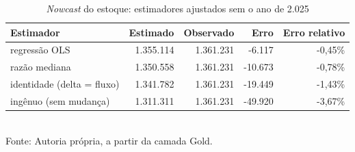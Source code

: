 \begin{table}[htbp]
    \centering
    \caption{\textit{Nowcast} do estoque: estimadores ajustados sem o ano de 2.025}
    \label{tab:nowcast}
    \footnotesize
    \renewcommand{\arraystretch}{1.25}
    \begin{tabular}{lrrrr}
        \toprule
        \rowcolor{black!8}
        \textbf{Estimador} & \textbf{Estimado} & \textbf{Observado} & \textbf{Erro} & \textbf{Erro relativo} \\
        \midrule
        regressão OLS & 1.355.114 & 1.361.231 & -6.117 & -0,45\% \\
        razão mediana & 1.350.558 & 1.361.231 & -10.673 & -0,78\% \\
        identidade (delta = fluxo) & 1.341.782 & 1.361.231 & -19.449 & -1,43\% \\
        ingênuo (sem mudança) & 1.311.311 & 1.361.231 & -49.920 & -3,67\% \\
        \bottomrule
    \end{tabular}
    \\[4pt]
    Fonte: Autoria própria, a partir da camada Gold.
\end{table}
